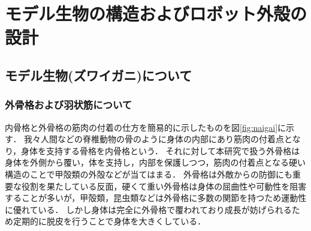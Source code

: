 \newpage
\section{モデル生物の構造およびロボット外殻の設計}
\subsection{モデル生物(ズワイガニ)について}
\subsubsection{外骨格および羽状筋について}
内骨格と外骨格の筋肉の付着の仕方を簡易的に示したものを図\ref{fig:naigai}に示す．
我々人間などの脊椎動物の骨のように身体の内部にあり筋肉の付着点となり，身体を支持する骨格を内骨格という．
それに対して本研究で扱う外骨格は身体を外側から覆い，体を支持し，内部を保護しつつ，筋肉の付着点となる硬い構造のことで甲殻類の外殻などが当てはまる．
外骨格は外敵からの防御にも重要な役割を果たしている反面，硬くて重い外骨格は身体の屈曲性や可動性を阻害することが多いが，甲殻類，昆虫類などは外骨格に多数の関節を持つため運動性に優れている．
しかし身体は完全に外骨格で覆われており成長が妨げられるため定期的に脱皮を行うことで身体を大きくしている．

